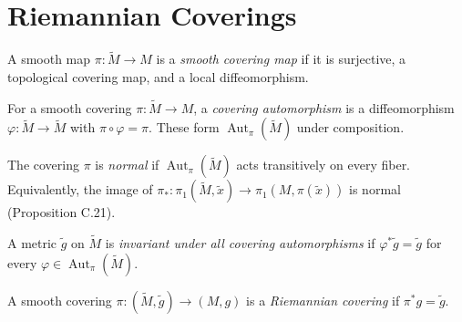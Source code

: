 \section{Riemannian Coverings}

\begin{definition}
\label{def:smooth-covering-map}





A smooth map $\pi:\tilde M\to M$ is a \emph{smooth covering map} if it is surjective, a topological covering map, and a local diffeomorphism.
\end{definition}

\begin{definition}
\label{def:covering-automorphism-group}





For a smooth covering $\pi:\tilde M\to M$, a \emph{covering automorphism} is a diffeomorphism $\varphi:\tilde M\to\tilde M$ with $\pi\circ\varphi=\pi$. These form $\operatorname{Aut}_\pi(\tilde M)$ under composition.
\end{definition}

\begin{definition}
\label{def:normal-covering-fibre-transitive}





The covering $\pi$ is \emph{normal} if $\operatorname{Aut}_\pi(\tilde M)$ acts transitively on every fiber. Equivalently, the image of $\pi_*:\pi_1(\tilde M,\tilde x)\to\pi_1(M,\pi(\tilde x))$ is normal (Proposition C.21).
\end{definition}

\begin{definition}
\label{def:covering-automorphism-invariant-metric}





A metric $\tilde g$ on $\tilde M$ is \emph{invariant under all covering automorphisms} if $\varphi^*\tilde g=\tilde g$ for every $\varphi\in\operatorname{Aut}_\pi(\tilde M)$.
\end{definition}

\begin{definition}
\label{def:riemannian-covering}





A smooth covering $\pi:(\tilde M,\tilde g)\to(M,g)$ is a \emph{Riemannian covering} if $\pi^*g=\tilde g$.
\end{definition}


